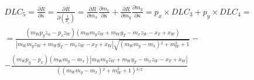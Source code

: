 \documentclass[a4paper,11pt]{article}
\begin{document}
\begin{equation}
\begin{split}
DLC_5 = \frac{ \partial R}{\partial \kappa} = \frac{ \partial R}{\partial \left(\frac{1}{p_z}\right)} = \frac{ \partial R}{\partial m_x}\frac{ \partial m_x}{\partial \kappa} + \frac{ \partial R}{\partial m_y}\frac{ \partial m_y}{\partial \kappa} = p_x \times DLC_3 + p_y \times DLC_4 = \\
= \frac{(m_W p_y z_w-p_x z_W)(m_W m_y z_W+m_W y_T-m_x z_W-x_T+x_W)}{|m_W m_y z_W+m_W y_T-m_x z_W-x_T+x_W|\sqrt{\left(m_W m_y-m_x\right){}^2+m_W^2+1}} - \\
-\frac{\left(m_W p_y-p_x\right) \left(m_W m_y-m_x\right) |m_W m_y z_W+m_W y_T-m_x z_W-x_T+x_W|}{\left(\left(m_W m_y-m_x\right){}^2+m_W^2+1\right){}^{3/2}}
\end{split}
\end{equation}









\end{document}
